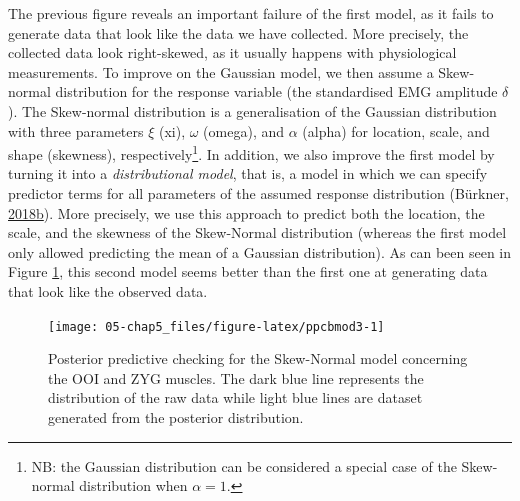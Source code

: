 \documentclass[a4paper,12pt,twoside,onecolumn,openright,final,oldfontcommands]{memoir}
\let\rmarkdownfootnote\footnote%
\def\footnote{\protect\rmarkdownfootnote}
\begin{document}
The previous figure reveals an important failure of the first model, as it fails to generate data that look like the data we have collected. More precisely, the collected data look right-skewed, as it usually happens with physiological measurements. To improve on the Gaussian model, we then assume a Skew-normal distribution for the response variable (the standardised EMG amplitude \(\delta\)). The Skew-normal distribution is a generalisation of the Gaussian distribution with three parameters \(\xi\) (xi), \(\omega\) (omega), and \(\alpha\) (alpha) for location, scale, and shape (skewness), respectively\footnote{NB: the Gaussian distribution can be considered a special case of the Skew-normal distribution when \(\alpha = 1\).}. In addition, we also improve the first model by turning it into a \emph{distributional model}, that is, a model in which we can specify predictor terms for all parameters of the assumed response distribution (Bürkner, \protect\hyperlink{ref-R-brms}{2018}\protect\hyperlink{ref-R-brms}{b}). More precisely, we use this approach to predict both the location, the scale, and the skewness of the Skew-Normal distribution (whereas the first model only allowed predicting the mean of a Gaussian distribution). As can been seen in Figure \ref{fig:ppcbmod3}, this second model seems better than the first one at generating data that look like the observed data.

\begin{figure}[ht]

{\centering \texttt{[image: 05-chap5\_files/figure-latex/ppcbmod3-1]} 

}

\caption{Posterior predictive checking for the Skew-Normal model concerning the OOI and ZYG muscles. The dark blue line represents the distribution of the raw data while light blue lines are dataset generated from the posterior distribution.}\label{fig:ppcbmod3}
\end{figure}
\end{document}
